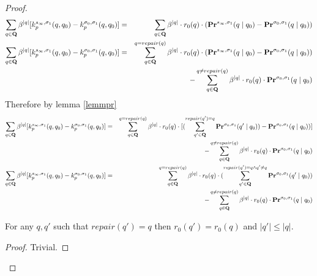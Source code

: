 \begin{proof}
	\begin{eqnarray*}
		\sum_{q \in \mathbf{Q}} \beta^{|q|} [k^{s_{\infty},\sigma_1}_p(q,q_0)- k^{\sigma_0,\sigma_1}_p(q,q_0) ]& = & \sum_{q \in \mathbf{Q}} \beta^{|q|} \cdot r_0(q)\cdot (\mathbf{Pr}^{s_{\infty},\sigma_1}(q \mid q_0)- \mathbf{Pr}^{\sigma_0,\sigma_1}(q \mid q_0) )\\
		\sum_{q \in \mathbf{Q}} \beta^{|q|} [k^{s_{\infty},\sigma_1}_p(q,q_0)- k^{\sigma_0,\sigma_1}_p(q,q_0) ] & = & \sum_{q \in \mathbf{Q}}^{q = repair(q)} \beta^{|q|} \cdot r_0(q)\cdot (\mathbf{Pr}^{s_{\infty},\sigma_1}(q \mid q_0)- \mathbf{Pr}^{\sigma_0,\sigma_1}(q \mid q_0) )\\
		&& - \sum_{q \in \mathbf{Q}}^{q \neq repair(q)} \beta^{|q|} \cdot r_0(q)\cdot\mathbf{Pr}^{\sigma_0,\sigma_1}(q \mid q_0) \\
	\end{eqnarray*}
	Therefore by lemma \ref{lemmpr}
	\begin{eqnarray*}
		\sum_{q \in \mathbf{Q}} \beta^{|q|} [k^{s_{\infty},\sigma_1}_p(q,q_0)- k^{\sigma_0,\sigma_1}_p(q,q_0) ] & = & \sum_{q \in \mathbf{Q}}^{q = repair(q)} \beta^{|q|} \cdot r_0(q)\cdot [(\sum_{q'\in \mathbf{Q}}^{repair(q') = q} \mathbf{Pr}^{\sigma_0,\sigma_1}(q' \mid q_0))- \mathbf{Pr}^{\sigma_0,\sigma_1}(q \mid q_0) )]\\
		&& - \sum_{q \in \mathbf{Q}}^{q \neq repair(q)} \beta^{|q|} \cdot r_0(q)\cdot\mathbf{Pr}^{\sigma_0,\sigma_1}(q \mid q_0) \\
		\sum_{q \in \mathbf{Q}} \beta^{|q|} [k^{s_{\infty},\sigma_1}_p(q,q_0)- k^{\sigma_0,\sigma_1}_p(q,q_0) ] & = & \sum_{q \in \mathbf{Q}}^{q = repair(q)} \beta^{|q|} \cdot r_0(q)\cdot (\sum_{q'\in \mathbf{Q}}^{repair(q') = q \land q' \neq q} \mathbf{Pr}^{\sigma_0,\sigma_1}(q' \mid q_0))\\
		&& - \sum_{q \in \mathbf{Q}}^{q \neq repair(q)} \beta^{|q|} \cdot r_0(q)\cdot\mathbf{Pr}^{\sigma_0,\sigma_1}(q \mid q_0) \\
	\end{eqnarray*}
	
	\begin{mylem}
		For any $q,q'$ such that $repair(q') = q$ then $r_0(q') = r_0(q)$ and $|q'| \leq |q|$.
	\end{mylem}
	\begin{proof}
		Trivial.
	\end{proof}
	

\end{proof}
